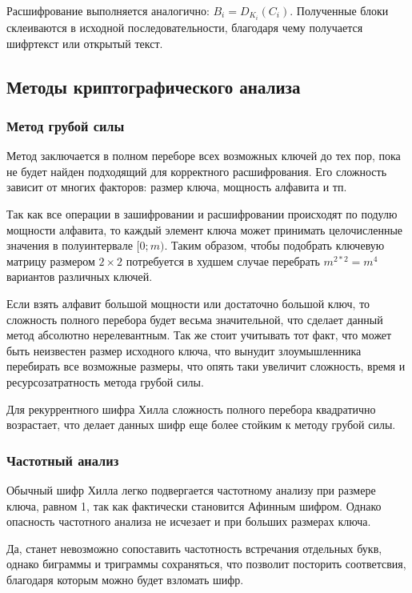 \documentclass[a4paper]{article}
\begin{document}
  Расшифрование выполняется аналогично: $B_i = D_{K_i}(C_i)$. Полученные блоки склеиваются в исходной последовательности, благодаря чему получается шифртекст или открытый текст.

  \subsection{Методы криптографического анализа}

  \subsubsection{Метод грубой силы}

  Метод заключается в полном переборе всех возможных ключей до тех пор, пока не будет найден подходящий
  для корректного расшифрования. Его сложность зависит от многих факторов: размер ключа, мощность алфавита
  и тп.

  Так как все операции в зашифровании и расшифровании происходят по подулю мощности алфавита,
  то каждый элемент ключа может принимать целочисленные значения в полуинтервале $[0; m)$.
  Таким образом, чтобы подобрать ключевую матрицу размером $2 \times 2$ потребуется в
  худшем случае перебрать $m^{2 * 2} = m^4$ вариантов различных ключей.

  Если взять алфавит большой мощности или достаточно большой ключ, то сложность полного
  перебора будет весьма значительной, что сделает данный метод абсолютно нерелевантным.
  Так же стоит учитывать тот факт, что может быть неизвестен размер исходного ключа,
  что вынудит злоумышленника перебирать все возможные размеры, что опять таки увеличит
  сложность, время и ресурсозатратность метода грубой силы.

  Для рекуррентного шифра Хилла сложность полного перебора квадратично возрастает, что делает
  данных шифр еще более стойким к методу грубой силы.

  \subsubsection{Частотный анализ}

  Обычный шифр Хилла легко подвергается частотному анализу при размере ключа, равном 1,
  так как фактически становится Афинным шифром. Однако опасность частотного анализа
  не исчезает и при больших размерах ключа.

  Да, станет невозможно сопоставить частотность встречания отдельных букв, однако биграммы и триграммы
  сохраняться, что позволит посторить соответсвия, благодаря которым можно будет взломать шифр.
\end{document}
